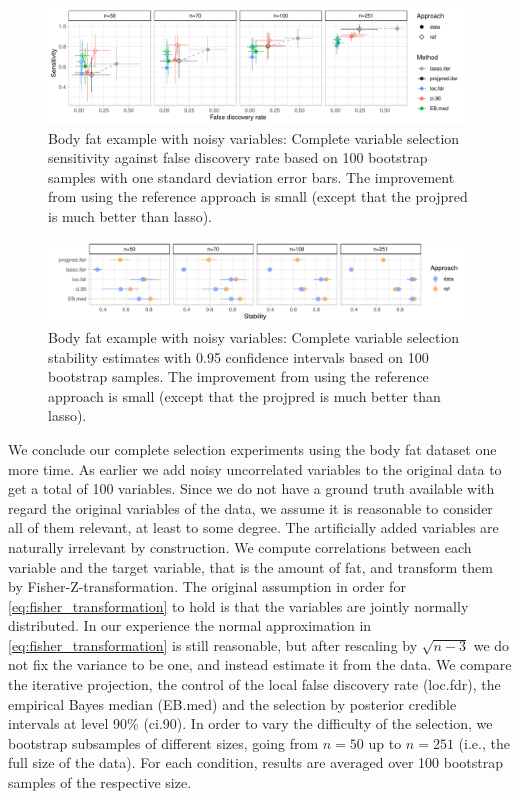 \documentclass[a4]{article}
\theoremstyle{definition}
\begin{document}
\begin{figure}[tp]
  \centering
  \includegraphics[width=0.98\textwidth]{graphics/bodyfat_sensitivity_vs_fdr.pdf}
  \vspace{-0.3\baselineskip}
  \caption{Body fat example with noisy variables: Complete variable selection sensitivity against false discovery rate based on 100 bootstrap samples with one standard deviation error bars. The improvement from using the reference approach is small (except that the projpred is much better than lasso).}
  \label{fig:bodyfat_sensitivity_vs_fdr}
\end{figure}
\begin{figure}[tp]
  \centering
  \includegraphics[width=0.98\textwidth]{graphics/bodyfat_stability.pdf}
  \vspace{-0.3\baselineskip}
  \caption{Body fat example with noisy variables: Complete variable selection stability estimates with 0.95 confidence intervals based on 100 bootstrap samples. The improvement from using the reference approach is small (except that the projpred is much better than lasso).}
  \label{fig:bodyfat_stability}
\end{figure}

We conclude our complete selection experiments using the body fat
dataset one more time. As earlier we add noisy uncorrelated variables
to the original data to get a total of 100 variables.
Since we do not have a ground truth available with regard the original
variables of the data, we assume it is reasonable to consider all of
them relevant, at least to some degree. The artificially added
variables are naturally irrelevant by construction.
We compute
correlations between each variable and the target variable, that is
the amount of fat, and transform them by Fisher-Z-transformation. The
original assumption in order for \eqref{eq:fisher_transformation} to
hold is that the variables are jointly normally distributed. In our
experience the normal approximation in
\eqref{eq:fisher_transformation} is still reasonable, but after
rescaling by $\sqrt{n-3}$ we do not fix the variance to be one, and
instead estimate it from the data. We compare the iterative projection, 
the control of the local false discovery rate (loc.fdr), 
the empirical Bayes median (EB.med)
and the selection by posterior credible intervals at level 90\%
(ci.90).  In order to vary the difficulty of the selection, we
bootstrap subsamples of different sizes, going from $n=50$ up to
$n=251$ (i.e., the full size of the data). For each condition, results
are averaged over 100 bootstrap samples of the respective size.
\end{document}
